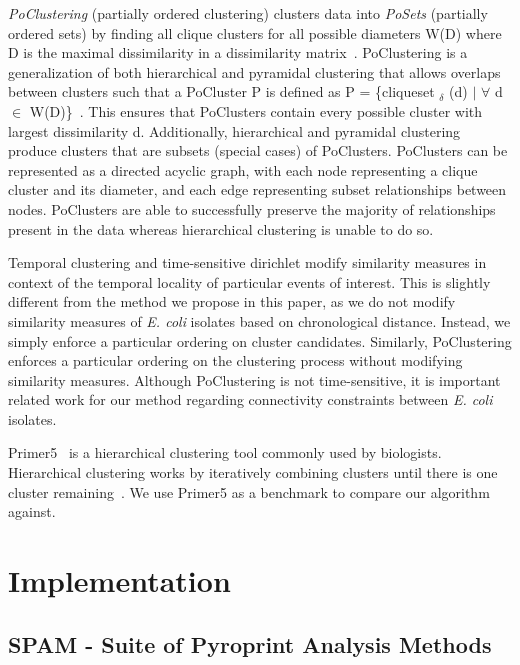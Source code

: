 \documentclass[12pt]{ucthesis}
\begin{document}
   \textit{PoClustering} (partially ordered clustering) clusters data into
   \textit{PoSets} (partially ordered sets) by finding all clique clusters for
   all possible diameters W(D) where D is the maximal dissimilarity in a
   dissimilarity matrix~\cite{Liu:CPD}. PoClustering is a generalization of both
   hierarchical and pyramidal clustering that allows overlaps between clusters such that a
   PoCluster P is defined as P = \{cliqueset $_{\delta}$ (d) $\mid$ $\forall$ d $\in$
   W(D)\}~\cite{Liu:PoClustering}. This ensures that PoClusters contain every
   possible cluster with largest dissimilarity d. Additionally, hierarchical
   and pyramidal clustering produce clusters that are subsets (special cases) of
   PoClusters. PoClusters can be represented as a directed acyclic graph, with
   each node representing a clique cluster and its diameter, and each edge
   representing subset relationships between nodes. PoClusters are able to
   successfully preserve the majority of relationships present in the data
   whereas hierarchical clustering is unable to do so.

   Temporal clustering and time-sensitive dirichlet modify similarity measures in
   context of the temporal locality of particular events of interest. This is
   slightly different from the method we propose in this paper, as we do not
   modify similarity measures of \textit{E. coli} isolates based on chronological distance. 
   Instead, we simply enforce a particular ordering on cluster candidates. 
   Similarly, PoClustering enforces a particular ordering on the clustering process without
   modifying similarity measures. Although PoClustering is not
   time-sensitive, it is important related work for our method regarding
   connectivity constraints between \textit{E. coli} isolates. 

   Primer5~\cite{Primer5:methods} is a hierarchical clustering tool commonly used by biologists.
   Hierarchical clustering works by iteratively combining clusters until there is
   one cluster remaining~\cite{DataMining}. We use
   Primer5 as a benchmark to compare our algorithm against.

\chapter{Implementation}\label{chap:implementation}

   \section{SPAM - Suite of Pyroprint Analysis Methods}\label{sec:spam}
\end{document}
